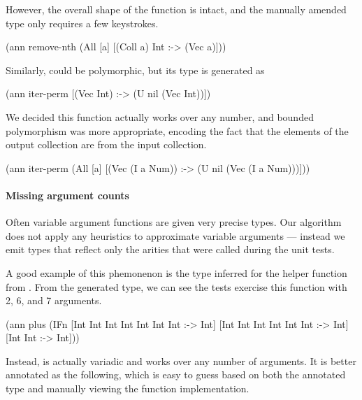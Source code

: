 However, the overall shape of the function is intact,
and the manually amended type only requires a few 
keystrokes.

\begin{cljlisting}
(ann remove-nth (All [a] [(Coll a) Int :-> (Vec a)]))
\end{cljlisting}

Similarly,  could be polymorphic, 
but its type is generated as

\begin{cljlisting}
(ann iter-perm [(Vec Int) :-> (U nil (Vec Int))])
\end{cljlisting}

We decided this function actually works over any number,
and bounded polymorphism was more appropriate, encoding
the fact that the elements of the output collection
are from the input collection.

\begin{cljlisting}
(ann iter-perm (All [a] [(Vec (I a Num)) :-> (U nil (Vec (I a Num)))]))
\end{cljlisting}
%

\paragraph{Missing argument counts}
Often variable argument functions are given very precise types.
Our algorithm does not apply any heuristics to approximate
variable arguments --- instead we emit types that reflect
only the arities that were called during the unit tests.

A good example of this phemonenon is the type inferred
for the  helper function from .
From the generated type, we can see the tests exercise this function with 2, 6,
and 7 arguments.

\begin{cljlisting}
(ann plus
  (IFn [Int Int Int Int Int Int Int :-> Int]
       [Int Int Int Int Int Int :-> Int]
       [Int Int :-> Int]))
\end{cljlisting}

Instead,  is actually variadic and works over any number of arguments.
It is better annotated as the following, which is easy to guess based on
both the annotated type and manually viewing the function implementation.

